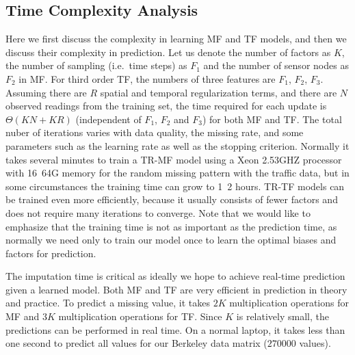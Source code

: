 \subsection{Time Complexity Analysis}
Here we first discuss the complexity in learning MF and TF models, and then we discuss their complexity in prediction.
Let us denote the number of factors as $K$, the number of sampling (i.e.\ time steps) as $F_1$ and the number of sensor nodes as $F_2$ in MF.
For third order TF, the numbers of three features are $F_1$, $F_2$, $F_3$.  
Assuming there are $R$ spatial and temporal regularization terms, and there are $N$ observed readings from the training set, the time required for each update is $\Theta(KN + KR)$ (independent of $F_1$, $F_2$ and $F_3$) for both MF and TF.
The total nuber of iterations varies with data quality, the missing rate, and some parameters such as the learning rate as well as the stopping criterion.
Normally it takes several minutes to train a TR-MF model using a Xeon 2.53GHZ processor with 16~64G memory for the random missing pattern with the traffic data, but in some circumstances the training time can grow to 1~2 hours.
TR-TF models can be trained even more efficiently, because it usually consists of fewer factors and does not require many iterations to converge. 
Note that we would like to emphasize that the training time is not as important as the prediction time, as normally we need only to train our model once to learn the optimal biases and factors for prediction.

The imputation time is critical as ideally we hope to achieve real-time prediction given a learned model. 
Both MF and TF are very efficient in prediction in theory and practice.
To predict a missing value, it takes $2K$ multiplication operations for MF and $3K$ multiplication operations for TF.
Since $K$ is relatively small, the predictions can be performed in real time.
On a normal laptop, it takes less than one second to predict all values for our Berkeley data matrix ($270000$ values).

